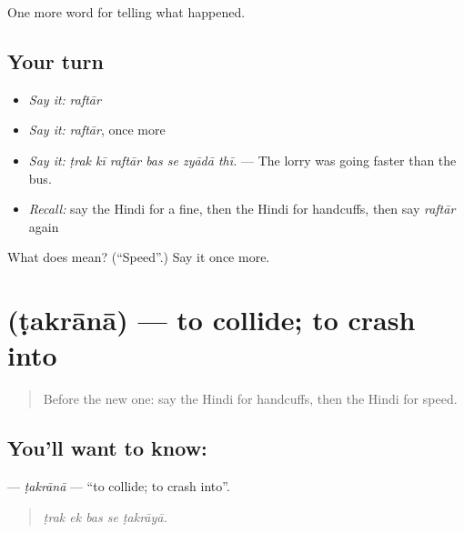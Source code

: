 \begin{grammarlens}[title={What you've built}]
One more word for telling what happened.
\end{grammarlens}

\subsection*{Your turn}
\begin{itemize}
\raggedright
  \item \emph{Say it:} \emph{raftār}
  \item \emph{Say it:} \emph{raftār}, once more
  \item \emph{Say it:} \emph{ṭrak kī raftār bas se zyādā thī.} — The lorry was going faster than the bus.
  \item \emph{Recall:} say the Hindi for a fine, then the Hindi for handcuffs, then say \emph{raftār} again
\end{itemize}

\begin{tcolorbox}[breakable,colback=teal!4,colframe=teal!35!black,title={Before you move on}]
What does  mean? (\textquotedblleft{}Speed\textquotedblright{}.) Say it once more.
\end{tcolorbox}
\section[\texorpdfstring{\hi{टकराना} (ṭakrānā)}{टकराना (ṭakrānā)}]{ (ṭakrānā) — to collide; to crash into}

\label{lesson:HI-C296-takrana}



\begin{quote}
Before the new one: say the Hindi for handcuffs, then the Hindi for speed.
\end{quote}

\subsection*{You'll want to know: }
\textbf{} — \emph{ṭakrānā} — \textquotedblleft{}to collide; to crash into\textquotedblright{}.

\begin{quote}
    
\end{quote}

\begin{quote}
\emph{ṭrak ek bas se ṭakrāyā.}
\end{quote}

